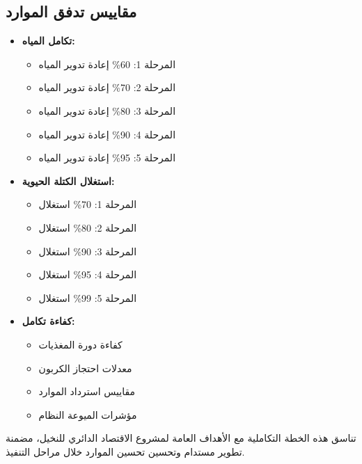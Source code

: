 \subsection{مقاييس تدفق الموارد}
\begin{itemize}
    \item \textbf{تكامل المياه:}
    \begin{itemize}
        \item المرحلة 1: 60\% إعادة تدوير المياه
        \item المرحلة 2: 70\% إعادة تدوير المياه
        \item المرحلة 3: 80\% إعادة تدوير المياه
        \item المرحلة 4: 90\% إعادة تدوير المياه
        \item المرحلة 5: 95\% إعادة تدوير المياه
    \end{itemize}
    \item \textbf{استغلال الكتلة الحيوية:}
    \begin{itemize}
        \item المرحلة 1: 70\% استغلال
        \item المرحلة 2: 80\% استغلال
        \item المرحلة 3: 90\% استغلال
        \item المرحلة 4: 95\% استغلال
        \item المرحلة 5: 99\% استغلال
    \end{itemize}
    \item \textbf{كفاءة تكامل:}
    \begin{itemize}
        \item كفاءة دورة المغذيات
        \item معدلات احتجاز الكربون
        \item مقاييس استرداد الموارد
        \item مؤشرات الميوعة النظام
    \end{itemize}
\end{itemize}

تناسق هذه الخطة التكاملية مع الأهداف العامة لمشروع الاقتصاد الدائري للنخيل، مضمنة تطوير مستدام وتحسين تحسين الموارد خلال مراحل التنفيذ.
